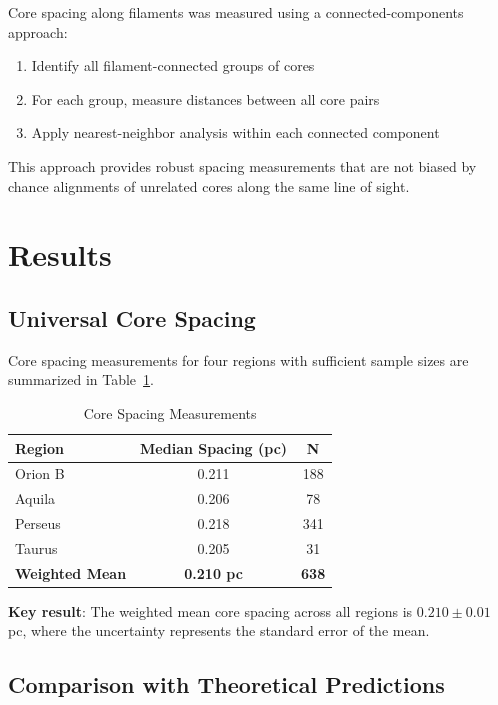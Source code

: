 \documentclass[11pt,a4paper]{article}
\begin{document}
Core spacing along filaments was measured using a connected-components approach:
\begin{enumerate}
    \item Identify all filament-connected groups of cores
    \item For each group, measure distances between all core pairs
    \item Apply nearest-neighbor analysis within each connected component
\end{enumerate}

This approach provides robust spacing measurements that are not biased by chance alignments of unrelated cores along the same line of sight.

\section{Results}

\subsection{Universal Core Spacing}

Core spacing measurements for four regions with sufficient sample sizes are summarized in Table~\ref{tab:spacing}.

\begin{table}[H]
\centering
\caption{Core Spacing Measurements}
\label{tab:spacing}
\begin{tabular}{lcc}
\toprule
Region & Median Spacing (pc) & N \\
\midrule
Orion B  & 0.211 & 188 \\
Aquila   & 0.206 & 78 \\
Perseus  & 0.218 & 341 \\
Taurus  & 0.205 & 31 \\
\midrule
\textbf{Weighted Mean} & \textbf{0.210 pc} & \textbf{638} \\
\bottomrule
\end{tabular}
\end{table}

\textbf{Key result}: The weighted mean core spacing across all regions is $0.210 \pm 0.01$ pc, where the uncertainty represents the standard error of the mean.

\subsection{Comparison with Theoretical Predictions}
\end{document}
